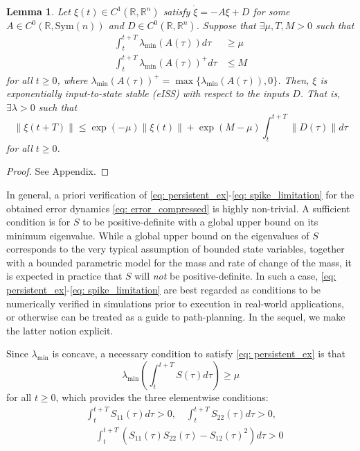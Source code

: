 \documentclass[letterpaper, 10 pt, conference]{ieeeconf}  %
\newcommand{\R}{\mathbb{R}}
\newtheorem{lemma}{Lemma}
\begin{document}
\begin{lemma}\label{lemma: persistent_excitation}
    Let $\xi(t) \in C^1(\R, \R^n)$ satisfy $\dot{\xi} = -A\xi + D$ for some $A \in C^0(\R, \text{Sym}(n))$ and $D \in C^0(\R, \R^{n})$. Suppose that $\exists \mu, T, M > 0$ such that
    \begin{align}
        \int_t^{t+T} \lambda_{\min}(A(\tau))d\tau &\ge \mu \label{eq: persistent_ex}\\
        \int_t^{t+T} \lambda_{\min}(A(\tau))^+d\tau &\le M \label{eq: spike_limitation}
    \end{align}
    for all $t \ge 0$, where $\lambda_{\min}(A(\tau))^+ = \max\{\lambda_{\min}(A(\tau)), 0\}$. Then, $\xi$ is exponentially input-to-state stable (eISS) with respect to the inputs $D$. That is, $\exists \lambda > 0$ such that
    \begin{equation*}
        \|\xi(t+T)\| \le \exp(-\mu)\|\xi(t)\| + \exp(M-\mu)\int_t^{t+T} \|D(\tau)\|d\tau
    \end{equation*}
    for all $t \ge 0$. 
\end{lemma}

\begin{proof}
    See Appendix.
\end{proof}

In general, a priori verification of \eqref{eq: persistent_ex}-\eqref{eq: spike_limitation} for the obtained error dynamics \eqref{eq: error_compressed} is highly non-trivial. A sufficient condition is for $S$ to be positive-definite with a global upper bound on its minimum eigenvalue. While a global upper bound on the eigenvalues of $S$ corresponds to the very typical assumption of bounded state variables, together with a bounded parametric model for the mass and rate of change of the mass, it is expected in practice that $S$ will \textit{not} be positive-definite. In such a case, \eqref{eq: persistent_ex}-\eqref{eq: spike_limitation} are best regarded as conditions to be numerically verified in simulations prior to execution in real-world applications, or otherwise can be treated as a guide to path-planning. In the sequel, we make the latter notion explicit. 

Since $\lambda_{\min}$ is concave, a necessary condition to satisfy \eqref{eq: persistent_ex} is that
$$\lambda_{\min}\left(\int_t^{t+T} S(\tau)d\tau \right) \ge \mu$$
for all $t \ge 0$, which provides the three elementwise conditions:
\begin{align*}
    &\int_t^{t+T} S_{11}(\tau)d\tau > 0, \quad \int_t^{t+T} S_{22}(\tau)d\tau > 0, \\
    &\quad \int_t^{t+T} \left(S_{11}(\tau)S_{22}(\tau) - S_{12}(\tau)^2\right) d\tau > 0
\end{align*}
\end{document}

